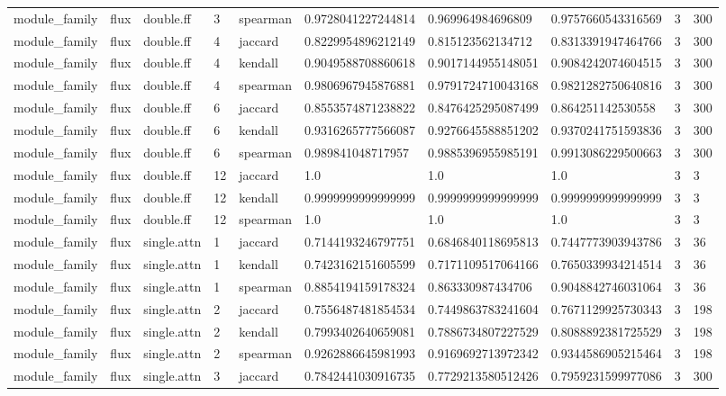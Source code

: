 \begin{tabular}{llllllllll}
module\_family & flux & double.ff & 3 & spearman & 0.9728041227244814 & 0.969964984696809 & 0.9757660543316569 & 3 & 300 \\
module\_family & flux & double.ff & 4 & jaccard & 0.8229954896212149 & 0.815123562134712 & 0.8313391947464766 & 3 & 300 \\
module\_family & flux & double.ff & 4 & kendall & 0.9049588708860618 & 0.9017144955148051 & 0.9084242074604515 & 3 & 300 \\
module\_family & flux & double.ff & 4 & spearman & 0.9806967945876881 & 0.9791724710043168 & 0.9821282750640816 & 3 & 300 \\
module\_family & flux & double.ff & 6 & jaccard & 0.8553574871238822 & 0.8476425295087499 & 0.864251142530558 & 3 & 300 \\
module\_family & flux & double.ff & 6 & kendall & 0.9316265777566087 & 0.9276645588851202 & 0.9370241751593836 & 3 & 300 \\
module\_family & flux & double.ff & 6 & spearman & 0.989841048717957 & 0.9885396955985191 & 0.9913086229500663 & 3 & 300 \\
module\_family & flux & double.ff & 12 & jaccard & 1.0 & 1.0 & 1.0 & 3 & 3 \\
module\_family & flux & double.ff & 12 & kendall & 0.9999999999999999 & 0.9999999999999999 & 0.9999999999999999 & 3 & 3 \\
module\_family & flux & double.ff & 12 & spearman & 1.0 & 1.0 & 1.0 & 3 & 3 \\
module\_family & flux & single.attn & 1 & jaccard & 0.7144193246797751 & 0.6846840118695813 & 0.7447773903943786 & 3 & 36 \\
module\_family & flux & single.attn & 1 & kendall & 0.7423162151605599 & 0.7171109517064166 & 0.7650339934214514 & 3 & 36 \\
module\_family & flux & single.attn & 1 & spearman & 0.8854194159178324 & 0.863330987434706 & 0.9048842746031064 & 3 & 36 \\
module\_family & flux & single.attn & 2 & jaccard & 0.7556487481854534 & 0.7449863783241604 & 0.7671129925730343 & 3 & 198 \\
module\_family & flux & single.attn & 2 & kendall & 0.7993402640659081 & 0.7886734807227529 & 0.8088892381725529 & 3 & 198 \\
module\_family & flux & single.attn & 2 & spearman & 0.9262886645981993 & 0.9169692713972342 & 0.9344586905215464 & 3 & 198 \\
module\_family & flux & single.attn & 3 & jaccard & 0.7842441030916735 & 0.7729213580512426 & 0.7959231599977086 & 3 & 300 \\

\end{tabular}
